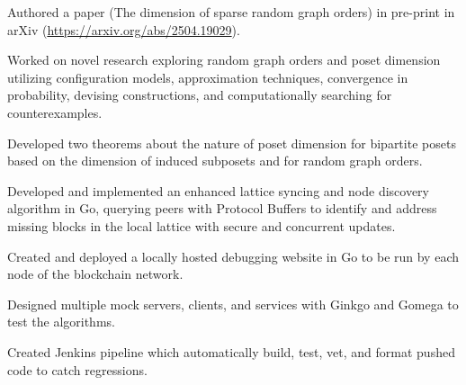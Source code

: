 \begin{resumeItem}
\begin{resumeList}
    \item Authored a paper (The dimension of sparse random graph orders) in pre-print in arXiv (\href{https://arxiv.org/abs/2504.19029}{https://arxiv.org/abs/2504.19029}).
    \item Worked on novel research exploring random graph orders and poset dimension utilizing configuration models, approximation techniques, convergence in probability, devising constructions, and computationally searching for counterexamples. 
    \item Developed two theorems about the nature of poset dimension for bipartite posets based on the dimension of induced subposets and for random graph orders.
\end{resumeList}
\end{resumeItem}

\begin{resumeItem}
\begin{resumeList}
    \item Developed and implemented an enhanced lattice syncing and node discovery algorithm in Go, querying peers with Protocol Buffers to identify and address missing blocks in the local lattice with secure and concurrent updates.
    \item Created and deployed a locally hosted debugging website in Go to be run by each node of the blockchain network.
    \item Designed multiple mock servers, clients, and services with Ginkgo and Gomega to test the algorithms.
    \item Created Jenkins pipeline which automatically build, test, vet, and format pushed code to catch regressions.
\end{resumeList}
\end{resumeItem}


